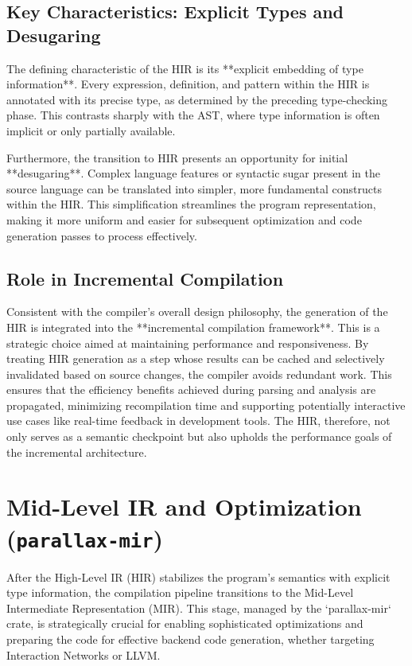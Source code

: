 \subsection{Key Characteristics: Explicit Types and Desugaring} %
The defining characteristic of the HIR is its **explicit embedding of type information**. Every expression, definition, and pattern within the HIR is annotated with its precise type, as determined by the preceding type-checking phase. This contrasts sharply with the AST, where type information is often implicit or only partially available.

Furthermore, the transition to HIR presents an opportunity for initial **desugaring**. Complex language features or syntactic sugar present in the source language can be translated into simpler, more fundamental constructs within the HIR. This simplification streamlines the program representation, making it more uniform and easier for subsequent optimization and code generation passes to process effectively.

\subsection{Role in Incremental Compilation} %
Consistent with the compiler's overall design philosophy, the generation of the HIR is integrated into the **incremental compilation framework**. This is a strategic choice aimed at maintaining performance and responsiveness. By treating HIR generation as a step whose results can be cached and selectively invalidated based on source changes, the compiler avoids redundant work. This ensures that the efficiency benefits achieved during parsing and analysis are propagated, minimizing recompilation time and supporting potentially interactive use cases like real-time feedback in development tools. The HIR, therefore, not only serves as a semantic checkpoint but also upholds the performance goals of the incremental architecture.

\section{Mid-Level IR and Optimization (\texttt{parallax-mir})} %
After the High-Level IR (HIR) stabilizes the program's semantics with explicit type information, the compilation pipeline transitions to the Mid-Level Intermediate Representation (MIR). This stage, managed by the `parallax-mir` crate, is strategically crucial for enabling sophisticated optimizations and preparing the code for effective backend code generation, whether targeting Interaction Networks or LLVM.

